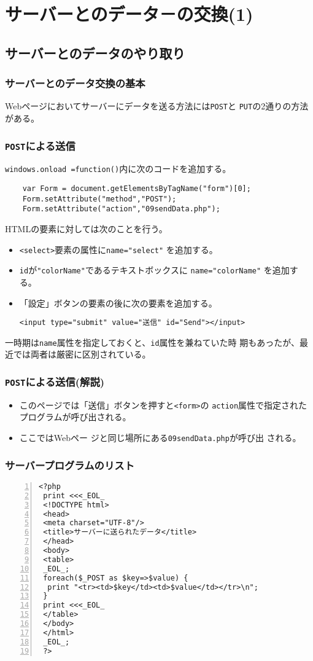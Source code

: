  \section{サーバーとのデータ－の交換(1)}
 \subsection{サーバーとのデータのやり取り}
 \begin{frame}[containsverbatim]
 \frametitle{サーバーとのデータ交換の基本}
 Webページにおいてサーバーにデータを送る方法には\texttt{POST}と
 \texttt{PUT}の2通りの方法がある。
 \end{frame}
 \begin{frame}[containsverbatim]
 \frametitle{\texttt{POST}による送信}
 \texttt{windows.onload =function()}内に次のコードを追加する。
 \begin{Verbatim}
    var Form = document.getElementsByTagName("form")[0];
    Form.setAttribute("method","POST");
    Form.setAttribute("action","09sendData.php");
 \end{Verbatim}
 HTMLの要素に対しては次のことを行う。
 \begin{itemize}
 \item \texttt{<select>}要素の属性に\verb+name="select"+ を追加する。
 \item \texttt{id}が\verb+"colorName"+であるテキストボックスに
       \verb+name="colorName"+ を追加する。
 \item 「設定」ボタンの要素の後に次の要素を追加する。
 \begin{center}
 \verb+<input type="submit" value="送信" id="Send"></input>+ 
 \end{center}
 \end{itemize}
 一時期は\texttt{name}属性を指定しておくと、\texttt{id}属性を兼ねていた時
 期もあったが、最近では両者は厳密に区別されている。
\end{frame}
 \begin{frame}[containsverbatim]
 \frametitle{\texttt{POST}による送信(解説)}
 \begin{itemize}
 \item このページでは「送信」ボタンを押すと\texttt{<form>}の
 \texttt{action}属性で指定されたプログラムが呼び出される。
 \item ここではWebペー ジと同じ場所にある\texttt{09sendData.php}が呼び出
      される。
 \end{itemize}
 \end{frame}
 \begin{frame}[containsverbatim]
 \frametitle{サーバープログラムのリスト}
 \begin{Verbatim}[numbers=left, fontsize=\scriptsize]
 <?php
 print <<<_EOL_
 <!DOCTYPE html>
 <head>
 <meta charset="UTF-8"/>
 <title>サーバーに送られたデータ</title>
 </head>
 <body>
 <table>
 _EOL_;
 foreach($_POST as $key=>$value) {
  print "<tr><td>$key</td><td>$value</td></tr>\n";
 }
 print <<<_EOL_
 </table>
 </body>
 </html>
 _EOL_;
 ?>
 \end{Verbatim}
 \end{frame}
